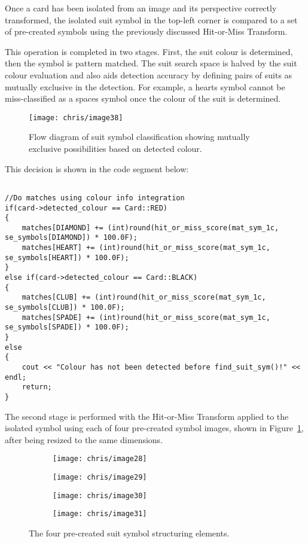 		Once a card has been isolated from an image and its perspective correctly transformed, the isolated suit symbol in the top-left corner is compared to a set of pre-created symbols using the previously discussed Hit-or-Miss Transform.

		This operation is completed in two stages. First, the suit colour is determined, then the symbol is pattern matched. The suit search space is halved by the suit colour evaluation and also aids detection accuracy by defining pairs of suits as mutually exclusive in the detection. For example, a hearts symbol cannot be miss-classified as a spaces symbol once the colour of the suit is determined.

		\begin{figure}[H]
			\centering
			\texttt{[image: chris/image38]}
			\caption{Flow diagram of suit symbol classification showing mutually exclusive possibilities based on detected colour.}
		\end{figure}

		This decision is shown in the code segment below:

		\begin{lstlisting}

//Do matches using colour info integration
if(card->detected_colour == Card::RED)
{
	matches[DIAMOND] += (int)round(hit_or_miss_score(mat_sym_1c, se_symbols[DIAMOND]) * 100.0F);
	matches[HEART] += (int)round(hit_or_miss_score(mat_sym_1c, se_symbols[HEART]) * 100.0F);
}
else if(card->detected_colour == Card::BLACK)
{
	matches[CLUB] += (int)round(hit_or_miss_score(mat_sym_1c, se_symbols[CLUB]) * 100.0F);
	matches[SPADE] += (int)round(hit_or_miss_score(mat_sym_1c, se_symbols[SPADE]) * 100.0F);
}
else
{
	cout << "Colour has not been detected before find_suit_sym()!" << endl;
	return;
}
		\end{lstlisting}

		The second stage is performed with the Hit-or-Miss Transform applied to the isolated symbol  using each of four pre-created symbol images, shown in Figure~\ref{fig:structelems}, after being resized to the same dimensions.

		\begin{figure}[H]
			\centering
			\begin{subfigure}[b]{0.15\textwidth}
				\centering
				\texttt{[image: chris/image28]}
				\caption{}
			\end{subfigure}
			\begin{subfigure}[b]{0.15\textwidth}
				\centering
				\texttt{[image: chris/image29]}
				\caption{}
			\end{subfigure}
			\begin{subfigure}[b]{0.15\textwidth}
				\centering
				\texttt{[image: chris/image30]}
				\caption{}
			\end{subfigure}
			\begin{subfigure}[b]{0.15\textwidth}
				\centering
				\texttt{[image: chris/image31]}
				\caption{}
			\end{subfigure}
			\caption{The four pre-created suit symbol structuring elements.}
			\label{fig:structelems}
		\end{figure}

